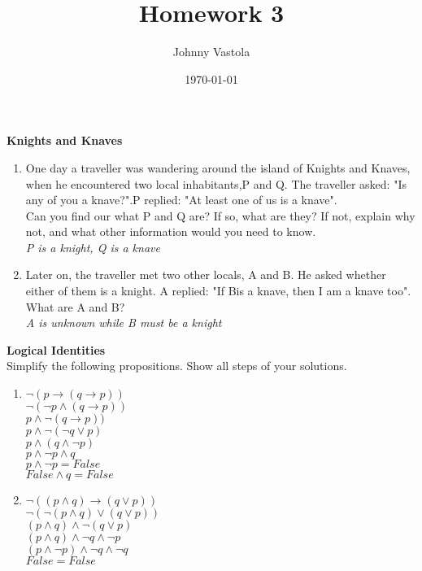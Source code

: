 \documentclass[12pt]{article}
\title{Homework 3}
\author{Johnny Vastola}
\date{\today}
\begin{document}
\maketitle



\textbf{Knights and Knaves}

\begin{enumerate}

\item
One day a traveller was wandering around the island of Knights and Knaves, when he encountered two local inhabitants,P and Q.  The traveller asked: "Is any of you a knave?".P replied:  "At least one of us is a knave".\\

Can you find our what P and Q are? If so, what are they? If not, explain why not, and what other information would you need to know.\\

\textit{P is a knight, Q is a knave}
\item
Later on, the traveller met two other locals, A and B.  He asked whether either of them is a knight. A replied:  "If Bis a knave, then I am a knave too".\\

What are A and B?\\

\textit{A is unknown while B must be a knight}

\end{enumerate}



\textbf{Logical Identities}\\

\indent Simplify the following propositions. Show all steps of your solutions.\\

\begin{enumerate}
\item
$\neg(p \to (q \to p))$ \\
$\neg(\neg p \land (q \to p))$\\
$p \land \neg (q \to p))$\\
$p \land \neg (\neg q \lor p)$\\
$p \land (q \land \neg p)$\\
$p \land \neg p \land q$\\
$p \land \neg p = False $\\
$False \land q = False $\\

\item
$\neg((p \land q) \to (q \lor p))$\\
$\neg(\neg (p \land q) \lor (q \lor p))$\\
$(p \land q) \land \neg (q \lor p)$\\
$(p \land q) \land \neg q \land \neg p$\\
$(p \land \neg p) \land \neg q \land \neg q$\\
$False = False$

\end{enumerate}
\end{document}
